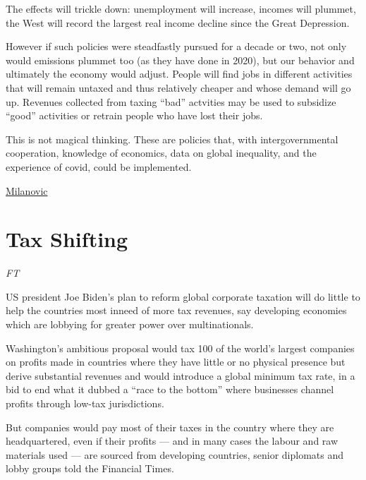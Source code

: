 \documentclass[
]{book}
\begin{document}
The effects will trickle down: unemployment will increase, incomes will plummet, the West will record the largest real income decline since the Great Depression.

However if such policies were steadfastly pursued for a decade or two, not only would emissions plummet too (as they have done in 2020), but our behavior and ultimately the economy would adjust. People will find jobs in different activities that will remain untaxed and thus relatively cheaper and whose demand will go up. Revenues collected from taxing ``bad'' actvities may be used to subsidize ``good'' activities or retrain people who have lost their jobs.

This is not magical thinking. These are policies that, with intergovernmental cooperation, knowledge of economics, data on global inequality, and the experience of covid, could be implemented.

\href{http://glineq.blogspot.com/2021/02/climate-change-covid-and-global.html}{Milanovic}

\hypertarget{tax-shifting}{%
\section{Tax Shifting}\label{tax-shifting}}

\emph{FT}

US president Joe Biden's plan to reform global corporate taxation will do little to help the countries most inneed of more tax revenues, say developing economies which are lobbying for greater power over multinationals.

Washington's ambitious proposal would tax 100 of the world's largest companies on profits made in countries where they have little or no physical presence but derive substantial revenues and would introduce a global minimum tax rate, in a bid to end what it dubbed a ``race to the bottom'' where businesses channel profits through low-tax jurisdictions.

But companies would pay most of their taxes in the country where they are headquartered, even if their profits --- and in many cases the labour and raw materials used --- are sourced from developing countries, senior diplomats and lobby groups told the Financial Times.
\end{document}
